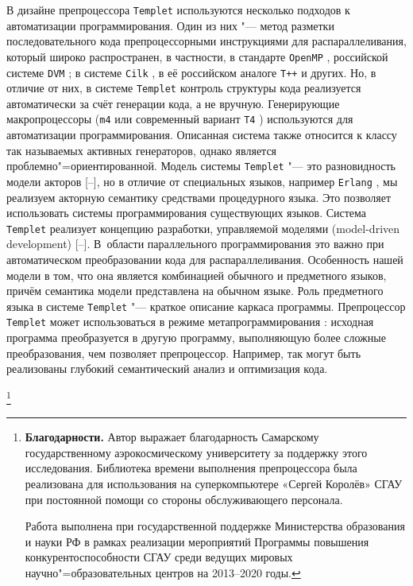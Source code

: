 В дизайне препроцессора {\tt Templet} используются несколько подходов к автоматизации программирования. 
Один из них "--- метод разметки последовательного кода препроцессорными инструкциями для распараллеливания, который широко распространен, в частности, в стандарте {\tt OpenMP} \cite{vostokin:bib9:r}, российской системе {\tt DVM} \cite{vostokin:bib10:r, vostokin:bib11:r}; в системе {\tt Cilk} \cite{vostokin:bib12:r}, в её российском аналоге {\tt T++} \cite{vostokin:bib13:r, vostokin:bib14:r}  и других. 
Но, в отличие от них, в системе {\tt Templet} контроль структуры кода реализуется автоматически за счёт генерации кода, а не вручную.
Генерирующие макропроцессоры ({\tt m4} \cite{vostokin:bib15:r} или современный вариант {\tt T4} \cite{vostokin:bib16:r})  используются для автоматизации программирования.
Описанная система также относится к классу  так называемых активных генераторов, однако является проблемно"=ориентированной. 
Модель системы {\tt Templet} "--- это разновидность модели акторов [--], но в отличие от специальных языков, например {\tt Erlang}  \cite{vostokin:bib18:r}, мы реализуем акторную семантику средствами процедурного языка. 
Это позволяет использовать системы программирования существующих языков. 
Система {\tt Templet} реализует концепцию разработки, управляемой моделями (model-driven development) [--]. 
В~области параллельного программирования это важно при  автоматическом преобразовании кода для распараллеливания. 
Особенность нашей модели в том, что она является комбинацией обычного и предметного языков, 
причём семантика модели представлена на обычном языке. 
Роль предметного языка в системе {\tt Templet} "--- краткое описание каркаса программы. 
Препроцессор {\tt Templet} может использоваться в режиме метапрограммирования \cite{vostokin:bib19-2:r, vostokin:bib20:r}: исходная программа преобразуется в другую программу, выполняющую более сложные преобразования, чем позволяет препроцессор.  
Например, так могут быть реализованы глубокий семантический анализ и оптимизация кода. 

\thanks{{\bf Благодарности.} Автор выражает благодарность Самарскому государственному аэрокосмическому университету за поддержку этого исследования. Библиотека времени выполнения препроцессора была реализована для использования на суперкомпьютере «Сергей Королёв» СГАУ при постоянной помощи со стороны обслуживающего персонала.

Работа выполнена при государственной поддержке Министерства образования и науки РФ в рамках реализации мероприятий Программы повышения конкурентоспособности СГАУ среди ведущих мировых научно"=образовательных центров на 2013--2020 годы.
} 



